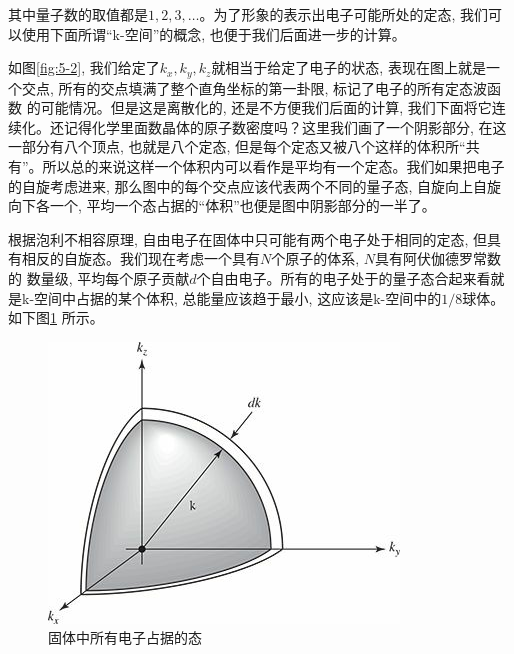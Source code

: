 \documentclass[a4paper,zihao=-4,linespread=1]{ctexrep}
\begin{document}
    其中量子数的取值都是$1,2,3,\ldots$。为了形象的表示出电子可能所处的定态, 我们可以使用下面所谓“k-空间”的概念, 也便于我们后面进一步的计算。
    
    
    如图\ref{fig:5-2}, 我们给定了$k_x,k_y,k_z$就相当于给定了电子的状态, 表现在图上就是一个交点, 所有的交点填满了整个直角坐标的第一卦限, 标记了电子的所有定态波函数
    的可能情况。但是这是离散化的, 还是不方便我们后面的计算, 我们下面将它连续化。还记得化学里面数晶体的原子数密度吗？这里我们画了一个阴影部分, 在这一部分有八个顶点, 也就是八个定态, 
    但是每个定态又被八个这样的体积所“共有”。所以总的来说这样一个体积内可以看作是平均有一个定态。我们如果把电子的自旋考虑进来, 那么图中的每个交点应该代表两个不同的量子态,
    自旋向上自旋向下各一个, 平均一个态占据的“体积”也便是图中阴影部分的一半了。
    
    根据泡利不相容原理, 自由电子在固体中只可能有两个电子处于相同的定态, 但具有相反的自旋态。我们现在考虑一个具有$N$个原子的体系, $N$具有阿伏伽德罗常数的
    数量级, 平均每个原子贡献$d$个自由电子。所有的电子处于的量子态合起来看就是k-空间中占据的某个体积, 总能量应该趋于最小, 这应该是k-空间中的$1/8$球体。如下图\ref{fig:5-3}
    所示。
    \begin{figure}
        \centering
        \includegraphics{fig/5-3.jpg}
        \caption{固体中所有电子占据的态}
        \label{fig:5-3}
    \end{figure}
    
\end{document}

